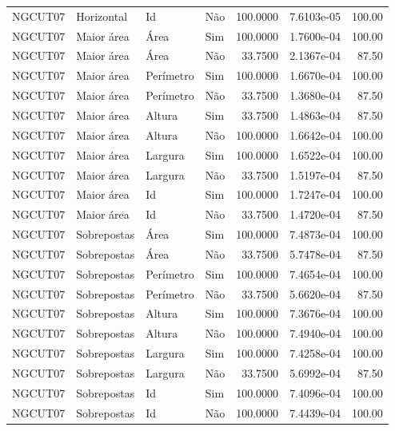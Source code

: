 \begin{tabular}{llllrrr}
NGCUT07   & Horizontal  & Id        & Não         & 100.0000     & 7.6103e-05 & 100.00   \\
NGCUT07   & Maior área  & Área      & Sim         & 100.0000     & 1.7600e-04 & 100.00   \\
NGCUT07   & Maior área  & Área      & Não         & 33.7500      & 2.1367e-04 & 87.50    \\
NGCUT07   & Maior área  & Perímetro & Sim         & 100.0000     & 1.6670e-04 & 100.00   \\
NGCUT07   & Maior área  & Perímetro & Não         & 33.7500      & 1.3680e-04 & 87.50    \\
NGCUT07   & Maior área  & Altura    & Sim         & 33.7500      & 1.4863e-04 & 87.50    \\
NGCUT07   & Maior área  & Altura    & Não         & 100.0000     & 1.6642e-04 & 100.00   \\
NGCUT07   & Maior área  & Largura   & Sim         & 100.0000     & 1.6522e-04 & 100.00   \\
NGCUT07   & Maior área  & Largura   & Não         & 33.7500      & 1.5197e-04 & 87.50    \\
NGCUT07   & Maior área  & Id        & Sim         & 100.0000     & 1.7247e-04 & 100.00   \\
NGCUT07   & Maior área  & Id        & Não         & 33.7500      & 1.4720e-04 & 87.50    \\
NGCUT07   & Sobrepostas & Área      & Sim         & 100.0000     & 7.4873e-04 & 100.00   \\
NGCUT07   & Sobrepostas & Área      & Não         & 33.7500      & 5.7478e-04 & 87.50    \\
NGCUT07   & Sobrepostas & Perímetro & Sim         & 100.0000     & 7.4654e-04 & 100.00   \\
NGCUT07   & Sobrepostas & Perímetro & Não         & 33.7500      & 5.6620e-04 & 87.50    \\
NGCUT07   & Sobrepostas & Altura    & Sim         & 100.0000     & 7.3676e-04 & 100.00   \\
NGCUT07   & Sobrepostas & Altura    & Não         & 100.0000     & 7.4940e-04 & 100.00   \\
NGCUT07   & Sobrepostas & Largura   & Sim         & 100.0000     & 7.4258e-04 & 100.00   \\
NGCUT07   & Sobrepostas & Largura   & Não         & 33.7500      & 5.6992e-04 & 87.50    \\
NGCUT07   & Sobrepostas & Id        & Sim         & 100.0000     & 7.4096e-04 & 100.00   \\
NGCUT07   & Sobrepostas & Id        & Não         & 100.0000     & 7.4439e-04 & 100.00   \\
\hline
\end{tabular}